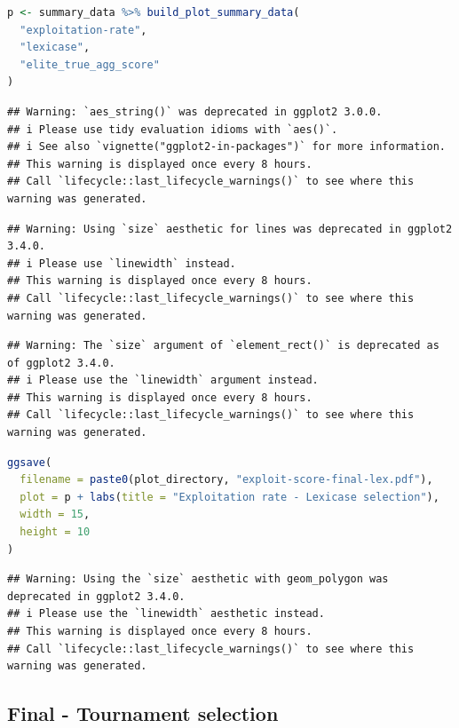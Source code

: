\documentclass[
]{book}
\begin{document}
\begin{lstlisting}[language=R]
p <- summary_data %>% build_plot_summary_data(
  "exploitation-rate",
  "lexicase",
  "elite_true_agg_score"
)
\end{lstlisting}

\begin{lstlisting}
## Warning: `aes_string()` was deprecated in ggplot2 3.0.0.
## i Please use tidy evaluation idioms with `aes()`.
## i See also `vignette("ggplot2-in-packages")` for more information.
## This warning is displayed once every 8 hours.
## Call `lifecycle::last_lifecycle_warnings()` to see where this warning was generated.
\end{lstlisting}

\begin{lstlisting}
## Warning: Using `size` aesthetic for lines was deprecated in ggplot2 3.4.0.
## i Please use `linewidth` instead.
## This warning is displayed once every 8 hours.
## Call `lifecycle::last_lifecycle_warnings()` to see where this warning was generated.
\end{lstlisting}

\begin{lstlisting}
## Warning: The `size` argument of `element_rect()` is deprecated as of ggplot2 3.4.0.
## i Please use the `linewidth` argument instead.
## This warning is displayed once every 8 hours.
## Call `lifecycle::last_lifecycle_warnings()` to see where this warning was generated.
\end{lstlisting}

\begin{lstlisting}[language=R]
ggsave(
  filename = paste0(plot_directory, "exploit-score-final-lex.pdf"),
  plot = p + labs(title = "Exploitation rate - Lexicase selection"),
  width = 15,
  height = 10
)
\end{lstlisting}

\begin{lstlisting}
## Warning: Using the `size` aesthetic with geom_polygon was deprecated in ggplot2 3.4.0.
## i Please use the `linewidth` aesthetic instead.
## This warning is displayed once every 8 hours.
## Call `lifecycle::last_lifecycle_warnings()` to see where this warning was generated.
\end{lstlisting}

\hypertarget{final---tournament-selection}{%
\subsection{Final - Tournament selection}\label{final---tournament-selection}}
\end{document}
